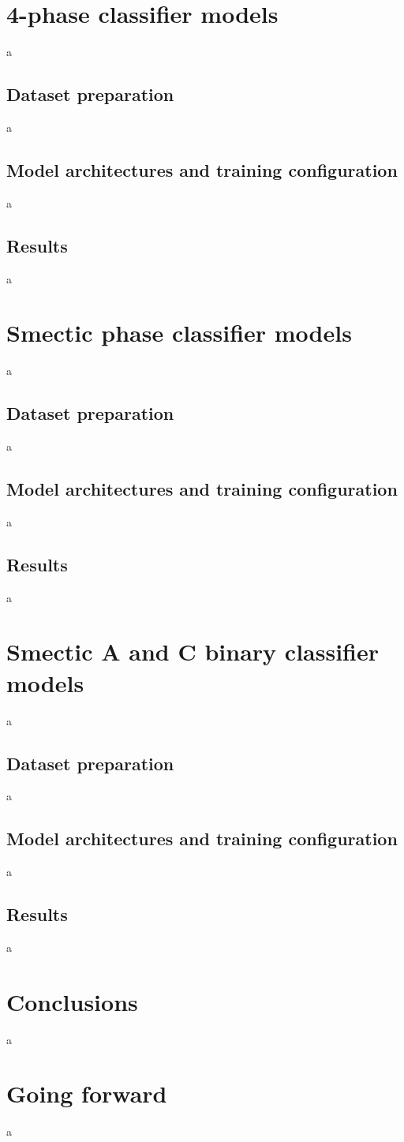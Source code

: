 \documentclass[12pt]{article}
\begin{document}
\section{4-phase classifier models}
a
\subsection{Dataset preparation}
a
\subsection{Model architectures and training configuration}
a
\subsection{Results}
a
\section{Smectic phase classifier models}
a
\subsection{Dataset preparation}
a
\subsection{Model architectures and training configuration}
a
\subsection{Results}
a
\section{Smectic A and C binary classifier models}
a
\subsection{Dataset preparation}
a
\subsection{Model architectures and training configuration}
a
\subsection{Results}
a
\section{Conclusions}
a
\section{Going forward}
a


\end{document}
